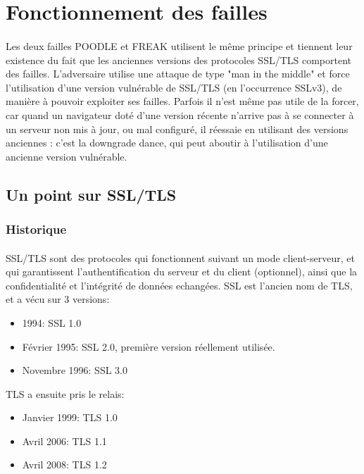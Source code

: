 \section{Fonctionnement des failles}

\paragraph{}
Les deux failles POODLE et FREAK utilisent le m\^eme principe et tiennent leur existence du fait que les anciennes versions des protocoles SSL/TLS comportent des failles. L'adversaire utilise une attaque de type "man in the middle" et force l'utilisation d'une version vulnérable de SSL/TLS (en l'occurrence SSLv3), de manière à pouvoir exploiter ses failles. Parfois il n'est m\^eme pas utile de la forcer, car quand un navigateur doté d’une version récente n’arrive pas à se connecter à un serveur non mis à jour, ou mal configuré, il réessaie en utilisant des versions anciennes : c’est la downgrade dance, qui peut aboutir à l'utilisation d'une ancienne version vulnérable.

\subsection{Un point sur SSL/TLS}

\subsubsection{Historique}

\paragraph{}
SSL/TLS sont des protocoles qui fonctionnent suivant un mode client-serveur, et qui garantissent l'authentification du serveur et du client (optionnel), ainsi que la confidentialité et l'intégrité de données echangées. SSL est l'ancien nom de TLS, et a vécu sur 3 versions:
\begin{itemize}
\item 1994: SSL 1.0
\item Février 1995: SSL 2.0, première version réellement utilisée.
\item Novembre 1996: SSL 3.0 
\end{itemize}
TLS a ensuite pris le relais: 
\begin{itemize}
\item Janvier 1999: TLS 1.0
\item Avril 2006: TLS 1.1
\item Avril 2008: TLS 1.2
\end{itemize}

